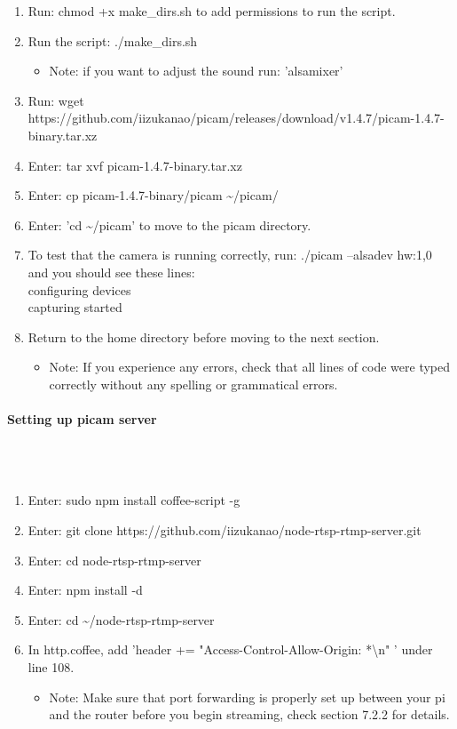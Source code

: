\documentclass[onecolumn, draftclsnofoot,10pt, compsoc]{IEEEtran}
\begin{document}
\begin{enumerate}
\item  Run: chmod +x make\_dirs.sh to add permissions to run the script. 
\item  Run the script: ./make\_dirs.sh  
\begin{itemize}
    \item Note: if you want to adjust the sound run: 'alsamixer'
\end{itemize}
\item  Run:
wget https://github.com/iizukanao/picam/releases/download/v1.4.7/picam-1.4.7-binary.tar.xz 
\item  Enter: tar xvf picam-1.4.7-binary.tar.xz 
\item  Enter: cp picam-1.4.7-binary/picam \~{}/picam/ 
\item  Enter: 'cd \~{}/picam' to move to the picam directory. 
\item  To test that the camera is running correctly, run: ./picam --alsadev hw:1,0 and you should see these lines:\\
configuring devices\\
capturing started
\item  Return to the home directory before moving to the next section.
\begin{itemize}
    \item Note: If you experience any errors, check that all lines of code were typed correctly without any spelling or grammatical errors.
\end{itemize}
\end{enumerate}

\paragraph{Setting up picam server} \\
\\
\begin{enumerate}
\item  Enter: sudo npm install coffee-script -g 
\item  Enter: git clone https://github.com/iizukanao/node-rtsp-rtmp-server.git 
\item  Enter: cd node-rtsp-rtmp-server 
\item  Enter: npm install -d 
\item  Enter: cd \~{}/node-rtsp-rtmp-server
\item  In http.coffee, add 'header += "Access-Control-Allow-Origin: *\textbackslash n" ' under line 108. 
\begin{itemize}
    \item Note: Make sure that port forwarding is properly set up between your pi and the router before you begin streaming, check section 7.2.2 for details.
\end{itemize}

\end{enumerate}
\end{document}
